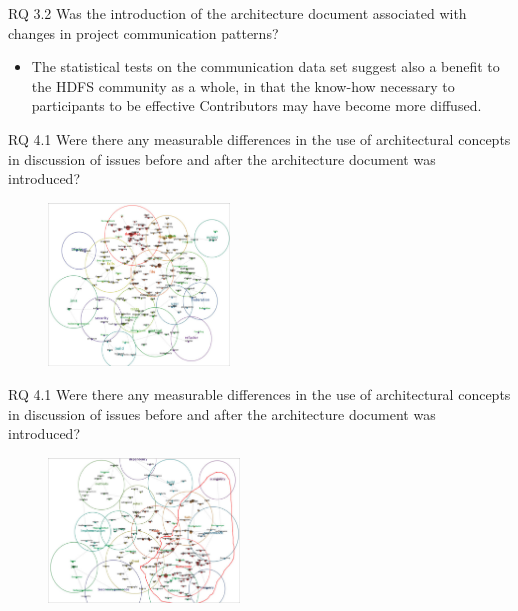 \documentclass[t,14pt,mathserif]{beamer}
\begin{document}
\begin{frame}{RQ 3.2 Was the introduction of the architecture document associated with changes in project communication patterns?}

	\begin{itemize}
		\item The statistical tests on the communication data set suggest also a benefit to the HDFS community as a whole, in that the know-how necessary to participants to be effective Contributors may have become more diffused.	
	\end{itemize}
	
	
\end{frame}




\begin{frame}{RQ 4.1 Were there any measurable differences in the use of architectural concepts in discussion of issues before and after the architecture document was introduced?}
	
	\begin{figure}[!t]
		\centering
		\includegraphics[width=1.9in]{../img/concept-map-before}
		\label{fig:promotion-table}
	\end{figure}
	
\end{frame}


\begin{frame}{RQ 4.1 Were there any measurable differences in the use of architectural concepts in discussion of issues before and after the architecture document was introduced?}
	
	\begin{figure}[!t]
		\centering
		\includegraphics[width=2.0in]{../img/concept-map-after}
		\label{fig:promotion-table}
	\end{figure}
	
\end{frame}
\end{document}
